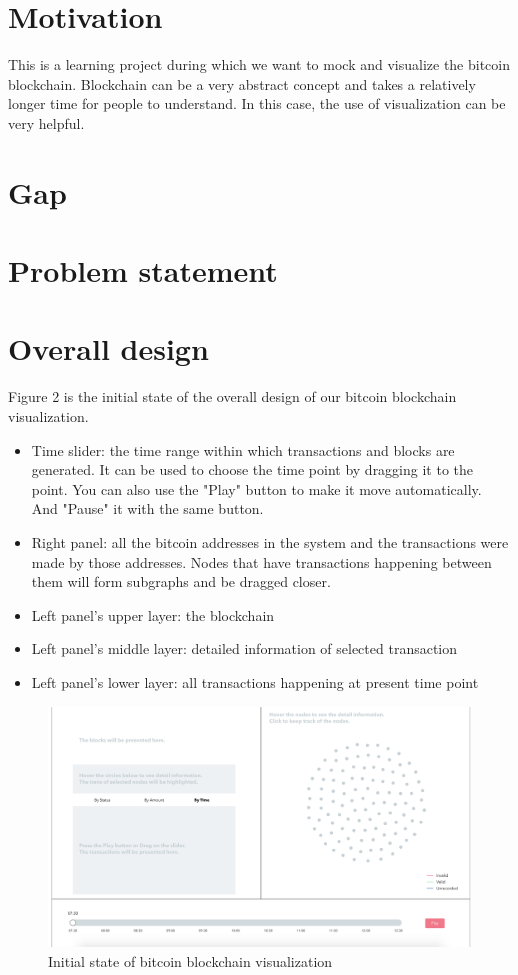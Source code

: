 \documentclass[journal, a4paper]{IEEEtran}
\begin{document}
\section{Motivation}
This is a learning project during which we want to mock and visualize the bitcoin blockchain. Blockchain can be a very abstract concept and takes a relatively longer time for people to understand. In this case, the use of visualization can be very helpful.

\section{Gap}

\section{Problem statement}

\section{Overall design}
Figure 2 is the initial state of the overall design of our bitcoin blockchain visualization.
\begin{itemize}
    \item Time slider: the time range within which transactions and blocks are generated. It can be used to choose the time point by dragging it to the point. You can also use the "Play" button to make it move automatically. And "Pause" it with the same button.
    \item Right panel: all the bitcoin addresses in the system and the transactions were made by those addresses. Nodes that have transactions happening between them will form subgraphs and be dragged closer.
    \item Left panel's upper layer: the blockchain
    \item Left panel's middle layer: detailed information of selected transaction
    \item Left panel's lower layer: all transactions happening at present time point
\end{itemize}

\begin{figure}[!hbt]
		\begin{center}
		\includegraphics[width=\columnwidth]{overall_design_start.png}
		\caption{Initial state of bitcoin blockchain visualization}
		\label{fig:overall_design}
		\end{center}
	\end{figure}
\end{document}
